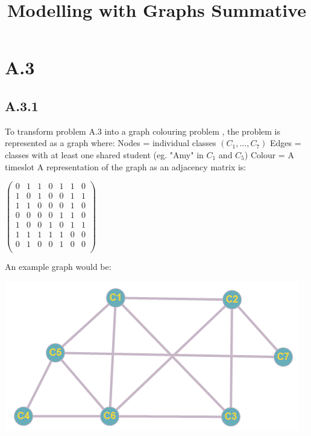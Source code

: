 \documentclass{article}
\title{Modelling with Graphs Summative }
\begin{document}
\maketitle
\newpage
\section*{A.3}
\subsection*{A.3.1}
To transform problem A.3 into a graph colouring problem , the problem is represented as a graph where:
\newline
Nodes = individual classes $(C_1,..., C_7)$
\newline
Edges = classes with at least one shared student (eg. "Amy" in $C_1$ and $C_5$)
\newline
Colour = A timeslot
\newline
A representation of the graph as an adjacency matrix is:
\newline
\begin{center}
$\begin{pmatrix}
   0&1&1&0&1&1&0\\
   1&0&1&0&0&1&1\\
   1&1&0&0&0&1&0\\
   0&0&0&0&1&1&0\\
   1&0&0&1&0&1&1\\
   1&1&1&1&1&0&0\\
   0&1&0&0&1&0&0\\
\end{pmatrix}$
\end{center}
An example graph would be:
\newline
\begin{center}
\includegraphics{a31NC}
\newline
\end{center}
\end{document}
